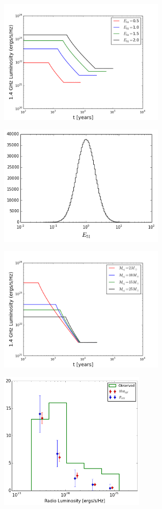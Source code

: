 \documentclass[10pt,a4paper]{article}
\begin{document}
\begin{figure}[h!]
	\begin{subfigure}[b]{0.51\textwidth}
		\includegraphics[width=8cm]{SNenergies.png}
		\caption{}
	\end{subfigure}
	\begin{subfigure}[b]{0.5\textwidth}
		\includegraphics[width=8cm]{SNEnergydist.png}
		\caption{}
	\end{subfigure}
	\begin{subfigure}[b]{0.5\textwidth}
		\includegraphics[width=8cm]{SNMasses.png}
		\caption{}
	\end{subfigure}
	\begin{subfigure}[b]{0.5\textwidth}
		\includegraphics[width=7cm]{Likelihood.png}

\end{subfigure}
\end{figure}
\end{document}
